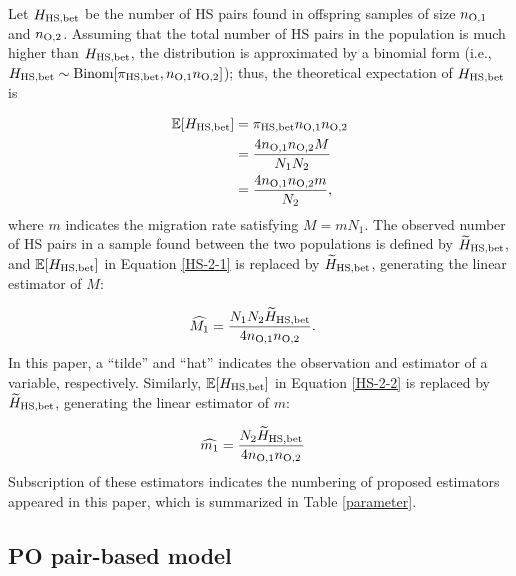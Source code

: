 \documentclass[12pt, English]{article}
\begin{document}
\begin{spacing}{1.9}
Let $H_{\rm HS,bet}$ be the number of HS pairs found in offspring samples of size $n_{\rm O, 1}$ and $n_{\rm O, 2}$. Assuming that the total number of HS pairs in the population is much higher than $H_{\rm HS,bet}$, the distribution is approximated by a binomial form (i.e., $H_{\rm HS,bet} \sim {\rm Binom}[\pi_{\rm HS,bet}, n_{\rm O, 1} n_{\rm O, 2}]$); thus, the theoretical expectation of $H_{\rm HS,bet}$ is

\begin{align}
\mathbb{E}[H_{\rm HS, bet}] &= \pi_{\rm HS,bet} n_{\rm O, 1} n_{\rm O, 2} \nonumber\\
&= \frac{ 4 n_{\rm O, 1} n_{\rm O, 2} M } { N_{1} N_{2} } \label{HS-2-1}\\
&= \frac{ 4 n_{\rm O, 1} n_{\rm O, 2} m } { N_{2} },
\label{HS-2-2}
\end{align}
where $m$ indicates the migration rate satisfying $M = mN_{1}$. The observed number of HS pairs in a sample found between the two populations is defined by $\widetilde{H}_{\rm HS, bet}$, and $\mathbb{E}[H_{\rm HS, bet}]$ in Equation \ref{HS-2-1} is replaced by $\widetilde{H}_{\rm HS, bet}$, generating the linear estimator of $M$:

\begin{align}
\widehat{M_1} &= \frac{N_{1} N_{2} \widetilde{H}_{\rm HS, bet} } {4 n_{\rm O, 1} n_{\rm O, 2} }.
\label{HS-3}
\end{align}
In this paper, a ``tilde'' and ``hat'' indicates the observation and estimator of a variable, respectively. Similarly, $\mathbb{E}[H_{\rm HS, bet}]$ in Equation \ref{HS-2-2} is replaced by $\widetilde{H}_{\rm HS, bet}$, generating the linear estimator of $m$:

\begin{align}
\widehat{m_1} &= \frac{N_{2} \widetilde{H}_{\rm HS, bet} } {4 n_{\rm O, 1} n_{\rm O, 2} }
\label{HS-3}
\end{align}
Subscription of these estimators indicates the numbering of proposed estimators appeared in this paper, which is summarized in Table \ref{parameter}. 

\begin{center}
\end{center}

\subsection{PO pair-based model}


\end{spacing}
\end{document}
